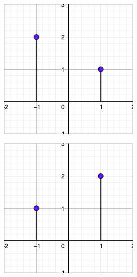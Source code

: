 \documentclass[a4paper]{book}
\begin{document}
\begin{figure}[htb]
	\centering
	\caption{Señales reflejadas}

	\hfill
	\begin{subfigure}[t]{0.4\textwidth}
		\includegraphics[width=\textwidth]{./Imágenes/aad.png}
	\end{subfigure}
	\hfill
	\begin{subfigure}[t]{0.4\textwidth}
		\includegraphics[width=\textwidth]{./Imágenes/aae.png}
	\end{subfigure}
	\hfill


\end{figure}
\end{document}
